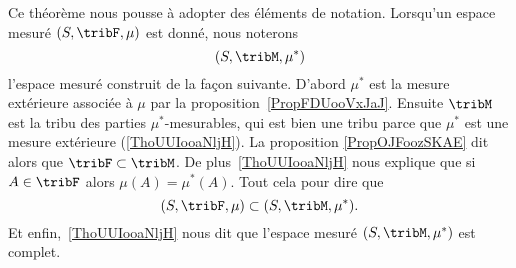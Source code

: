\begin{normaltext}

	Ce théorème nous pousse à adopter des éléments de notation. Lorsqu'un espace mesuré \( (S,\tribF,\mu)\) est donné, nous noterons
	\begin{equation}
		(S,\tribM,\mu^*)
	\end{equation}
	l'espace mesuré construit de la façon suivante. D'abord \( \mu^*\) est la mesure extérieure associée à \( \mu\) par la proposition~\ref{PropFDUooVxJaJ}. Ensuite \( \tribM\) est la tribu des parties \( \mu^*\)-mesurables, qui est bien une tribu parce que \( \mu^*\) est une mesure extérieure (\ref{ThoUUIooaNljH}). La proposition \eqref{PropOJFoozSKAE} dit alors que \( \tribF\subset\tribM\). De plus~\ref{ThoUUIooaNljH} nous explique que si \( A\in\tribF\) alors \( \mu(A)=\mu^*(A)\). Tout cela pour dire que
	\begin{equation}    \label{EqXDPooKwWAF}
		(S,\tribF,\mu)\subset (S,\tribM,\mu^*).
	\end{equation}
	Et enfin,~\ref{ThoUUIooaNljH} nous dit que l'espace mesuré \( (S,\tribM,\mu^*)\) est complet.
\end{normaltext}

